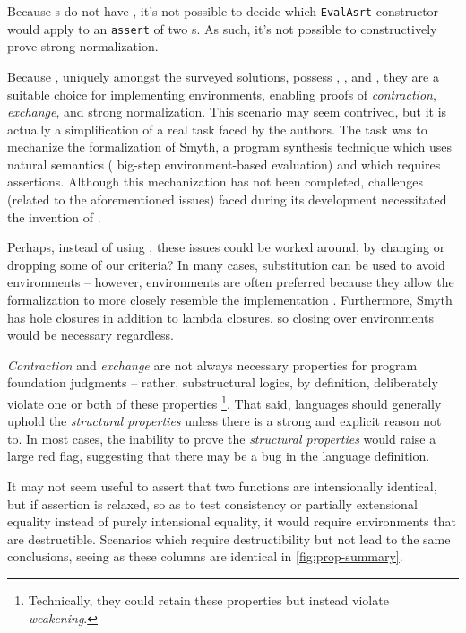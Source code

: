 Because \fpf{}s do not have \EqDec, it's not possible to decide which \texttt{EvalAsrt} constructor would
apply to an \texttt{assert} of two \fpf{}s. As such, it's not possible to constructively prove strong normalization.

Because \dds, uniquely amongst the surveyed solutions, possess \SemTot, \SemInj, and \EqDec,
they are a suitable choice for implementing environments, enabling proofs of \emph{contraction},
\emph{exchange}, and strong normalization.
This scenario may seem contrived, but it is actually a simplification of a real task faced by the authors.
The task was to mechanize the formalization of Smyth\citep{smyth}, a program synthesis technique which uses
natural semantics (\ie{} big-step environment-based evaluation) and which requires assertions.
Although this mechanization has not been completed, challenges (related to the aforementioned issues)
faced during its development necessitated the invention of \dds.

Perhaps, instead of using \dds, these issues could be worked around, by changing or dropping some of our criteria?
In many cases, substitution can be used to avoid environments -- however, environments are often preferred because
they allow the formalization to more closely resemble the implementation . Furthermore,
Smyth has hole closures in addition to lambda closures, so closing over environments would be necessary regardless.

\emph{Contraction} and \emph{exchange} are not always necessary properties for program foundation judgments --
rather, substructural logics, by definition, deliberately violate one or both of these properties%
\footnote{Technically, they could retain these properties but instead violate \emph{weakening}.}.
That said, languages should generally uphold the \emph{structural properties} unless there is a strong and explicit
reason not to. In most cases, the inability to prove the \emph{structural properties} would raise a large red flag,
suggesting that there may be a bug in the language definition.

It may not seem useful to assert that two functions are intensionally identical, but if assertion is relaxed,
so as to test consistency or partially extensional equality instead of purely intensional equality,
it would require environments that are destructible.
Scenarios which require destructibility but not \EqDec{} lead to the same conclusions,
seeing as these columns are identical in \autoref{fig:prop-summary}.

